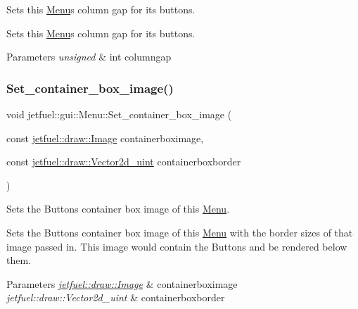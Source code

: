 Sets this \hyperlink{classjetfuel_1_1gui_1_1Menu}{Menu}\textquotesingle{}s column gap for it\textquotesingle{}s buttons. 

Sets this \hyperlink{classjetfuel_1_1gui_1_1Menu}{Menu}\textquotesingle{}s column gap for it\textquotesingle{}s buttons.


\begin{DoxyParams}{Parameters}
{\em unsigned} & int columngap \\
\hline
\end{DoxyParams}
\mbox{\label{classjetfuel_1_1gui_1_1Menu_a3ddedd81c865929157751c7857716318}} 
\subsubsection{\texorpdfstring{Set\+\_\+container\+\_\+box\+\_\+image()}{Set\_container\_box\_image()}}
{\footnotesize\ttfamily void jetfuel\+::gui\+::\+Menu\+::\+Set\+\_\+container\+\_\+box\+\_\+image (\begin{DoxyParamCaption}\item[{const \hyperlink{classjetfuel_1_1draw_1_1Image}{jetfuel\+::draw\+::\+Image}}]{containerboximage,  }\item[{const \hyperlink{classjetfuel_1_1draw_1_1Vector2d}{jetfuel\+::draw\+::\+Vector2d\+\_\+uint}}]{containerboxborder }\end{DoxyParamCaption})\hspace{0.3cm}{\ttfamily [inline]}}



Sets the Buttons\textquotesingle{} container box image of this \hyperlink{classjetfuel_1_1gui_1_1Menu}{Menu}. 

Sets the Buttons\textquotesingle{} container box image of this \hyperlink{classjetfuel_1_1gui_1_1Menu}{Menu} with the border sizes of that image passed in. This image would contain the Buttons and be rendered below them.


\begin{DoxyParams}{Parameters}
{\em \hyperlink{classjetfuel_1_1draw_1_1Image}{jetfuel\+::draw\+::\+Image}} & containerboximage \\
\hline
{\em jetfuel\+::draw\+::\+Vector2d\+\_\+uint} & containerboxborder \\
\hline
\end{DoxyParams}
\mbox{\label{classjetfuel_1_1gui_1_1Menu_ad713403a103dc547c7ae968bb6d5e2cd}} 
